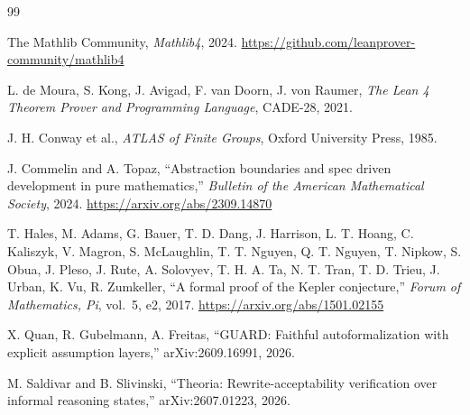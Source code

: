 ﻿\documentclass[11pt]{article}
\begin{document}
\begin{thebibliography}{99}

The Mathlib Community,
\emph{Mathlib4}, 2024.
\url{https://github.com/leanprover-community/mathlib4}

L. de Moura, S. Kong, J. Avigad, F. van Doorn,
J. von Raumer,
\emph{The Lean 4 Theorem Prover and Programming Language},
CADE-28, 2021.

J. H. Conway et al.,
\emph{ATLAS of Finite Groups},
Oxford University Press, 1985.

J. Commelin and A. Topaz,
``Abstraction boundaries and spec driven development
in pure mathematics,''
\emph{Bulletin of the American Mathematical Society}, 2024.
\url{https://arxiv.org/abs/2309.14870}

T. Hales, M. Adams, G. Bauer, T. D. Dang, J. Harrison,
L. T. Hoang, C. Kaliszyk, V. Magron, S. McLaughlin,
T. T. Nguyen, Q. T. Nguyen, T. Nipkow, S. Obua,
J. Pleso, J. Rute, A. Solovyev, T. H. A. Ta,
N. T. Tran, T. D. Trieu, J. Urban, K. Vu, R. Zumkeller,
``A formal proof of the Kepler conjecture,''
\emph{Forum of Mathematics, Pi}, vol.~5, e2, 2017.
\url{https://arxiv.org/abs/1501.02155}

X. Quan, R. Gubelmann, A. Freitas,
``GUARD: Faithful autoformalization with explicit
assumption layers,''
arXiv:2609.16991, 2026.

M. Saldivar and B. Slivinski,
``Theoria: Rewrite-acceptability verification over
informal reasoning states,''
arXiv:2607.01223, 2026.

\end{thebibliography}
\end{document}
